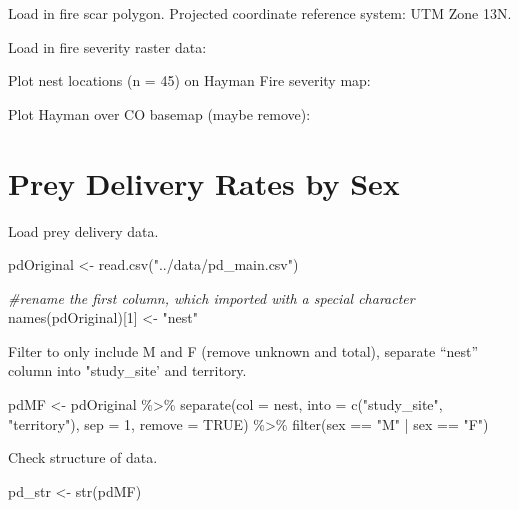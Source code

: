 \documentclass[
]{article}
\newenvironment{Shaded}{\begin{snugshade}}{\end{snugshade}}
\newcommand{\AttributeTok}[1]{\textcolor[rgb]{0.77,0.63,0.00}{#1}}
\newcommand{\CommentTok}[1]{\textcolor[rgb]{0.56,0.35,0.01}{\textit{#1}}}
\newcommand{\ConstantTok}[1]{\textcolor[rgb]{0.00,0.00,0.00}{#1}}
\newcommand{\DecValTok}[1]{\textcolor[rgb]{0.00,0.00,0.81}{#1}}
\newcommand{\FunctionTok}[1]{\textcolor[rgb]{0.00,0.00,0.00}{#1}}
\newcommand{\NormalTok}[1]{#1}
\newcommand{\OtherTok}[1]{\textcolor[rgb]{0.56,0.35,0.01}{#1}}
\newcommand{\SpecialCharTok}[1]{\textcolor[rgb]{0.00,0.00,0.00}{#1}}
\newcommand{\StringTok}[1]{\textcolor[rgb]{0.31,0.60,0.02}{#1}}
\begin{document}
Load in fire scar polygon. Projected coordinate reference system: UTM
Zone 13N.

Load in fire severity raster data:

Plot nest locations (n = 45) on Hayman Fire severity map:

Plot Hayman over CO basemap (maybe remove):

\hypertarget{prey-delivery-rates-by-sex}{%
\section{Prey Delivery Rates by Sex}\label{prey-delivery-rates-by-sex}}

Load prey delivery data.

\begin{Shaded}
\begin{Highlighting}[]
\NormalTok{pdOriginal }\OtherTok{\textless{}{-}} \FunctionTok{read.csv}\NormalTok{(}\StringTok{"../data/pd\_main.csv"}\NormalTok{)}


\CommentTok{\#rename the first column, which imported with a special character}
\FunctionTok{names}\NormalTok{(pdOriginal)[}\DecValTok{1}\NormalTok{] }\OtherTok{\textless{}{-}} \StringTok{"nest"}
\end{Highlighting}
\end{Shaded}

Filter to only include M and F (remove unknown and total), separate
``nest'' column into "study\_site' and territory.

\begin{Shaded}
\begin{Highlighting}[]
\NormalTok{pdMF }\OtherTok{\textless{}{-}}\NormalTok{ pdOriginal }\SpecialCharTok{\%\textgreater{}\%}
  \FunctionTok{separate}\NormalTok{(}\AttributeTok{col =}\NormalTok{ nest, }\AttributeTok{into =} \FunctionTok{c}\NormalTok{(}\StringTok{"study\_site"}\NormalTok{, }\StringTok{"territory"}\NormalTok{), }\AttributeTok{sep =} \DecValTok{1}\NormalTok{, }\AttributeTok{remove =} \ConstantTok{TRUE}\NormalTok{) }\SpecialCharTok{\%\textgreater{}\%}
  \FunctionTok{filter}\NormalTok{(sex }\SpecialCharTok{==} \StringTok{"M"} \SpecialCharTok{|}\NormalTok{ sex }\SpecialCharTok{==} \StringTok{"F"}\NormalTok{)}
\end{Highlighting}
\end{Shaded}

Check structure of data.

\begin{Shaded}
\begin{Highlighting}[]
\NormalTok{pd\_str }\OtherTok{\textless{}{-}} \FunctionTok{str}\NormalTok{(pdMF)}
\end{Highlighting}
\end{Shaded}
\end{document}
